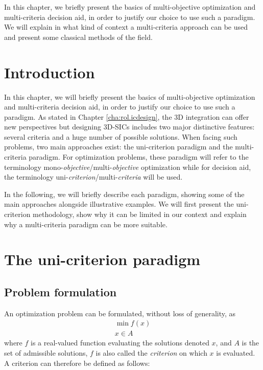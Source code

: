 \label{cha:rol.mcda}

\begin{summary}
In this chapter, we briefly present the basics of multi-objective optimization and multi-criteria decision aid, in order to justify our choice to use such a paradigm. We will explain in what kind of context a multi-criteria approach can be used and present some classical methods of the field.
\end{summary}

\section{Introduction}
\label{sec:rol2.intro}
In this chapter, we will briefly present the basics of multi-objective optimization and multi-criteria decision aid, in order to justify our choice to use such a paradigm. As stated in Chapter \ref{cha:rol.icdesign}, the 3D integration can offer new perspectives but designing 3D-SICs includes two major distinctive features: several criteria and a huge number of possible solutions. When facing such problems, two main approaches exist: the uni-criterion paradigm and the multi-criteria paradigm. For optimization problems, these paradigm will refer to the terminology mono-\emph{objective}/multi-\emph{objective} optimization while for decision aid, the terminology uni-\emph{criterion}/multi-\emph{criteria} will be used.

In the following, we will briefly describe each paradigm, showing some of the main approaches alongside illustrative examples. We will first present the uni-criterion methodology, show why it can be limited in our context and explain why a multi-criteria paradigm can be more suitable.

\section{The uni-criterion paradigm}
\label{sec:rol2.unicrit_paradigm}

\subsection{Problem formulation}
An optimization problem can be formulated, without loss of generality, as \cite{BraMar2002}
\begin{equation}
\label{eqn:optiprob}
\begin{gathered}
\min f(x)\\
x \in A
\end{gathered}
\end{equation}
where $f$ is a real-valued function evaluating the solutions denoted $x$, and $A$ is the set of admissible solutions, $f$ is also called the \emph{criterion} on which $x$ is evaluated. A criterion can therefore be defined as follows:

